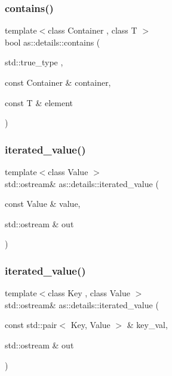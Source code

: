 \mbox{\label{namespaceas_1_1details_aa25b4a9ab19e3b807bbd58dc208d2607}} 
\subsubsection{\texorpdfstring{contains()}{contains()}\hspace{0.1cm}{\footnotesize\ttfamily [2/2]}}
{\footnotesize\ttfamily template$<$class Container , class T $>$ \\
bool as\+::details\+::contains (\begin{DoxyParamCaption}\item[{std\+::true\+\_\+type}]{,  }\item[{const Container \&}]{container,  }\item[{const T \&}]{element }\end{DoxyParamCaption})}

\mbox{\label{namespaceas_1_1details_a2e51ab78c6720ab244aa4cd08c5e7b55}} 
\subsubsection{\texorpdfstring{iterated\+\_\+value()}{iterated\_value()}\hspace{0.1cm}{\footnotesize\ttfamily [1/2]}}
{\footnotesize\ttfamily template$<$class Value $>$ \\
std\+::ostream\& as\+::details\+::iterated\+\_\+value (\begin{DoxyParamCaption}\item[{const Value \&}]{value,  }\item[{std\+::ostream \&}]{out }\end{DoxyParamCaption})}

\mbox{\label{namespaceas_1_1details_abb914e2826b38ed8ae4d2f8004843689}} 
\subsubsection{\texorpdfstring{iterated\+\_\+value()}{iterated\_value()}\hspace{0.1cm}{\footnotesize\ttfamily [2/2]}}
{\footnotesize\ttfamily template$<$class Key , class Value $>$ \\
std\+::ostream\& as\+::details\+::iterated\+\_\+value (\begin{DoxyParamCaption}\item[{const std\+::pair$<$ Key, Value $>$ \&}]{key\+\_\+val,  }\item[{std\+::ostream \&}]{out }\end{DoxyParamCaption})}

